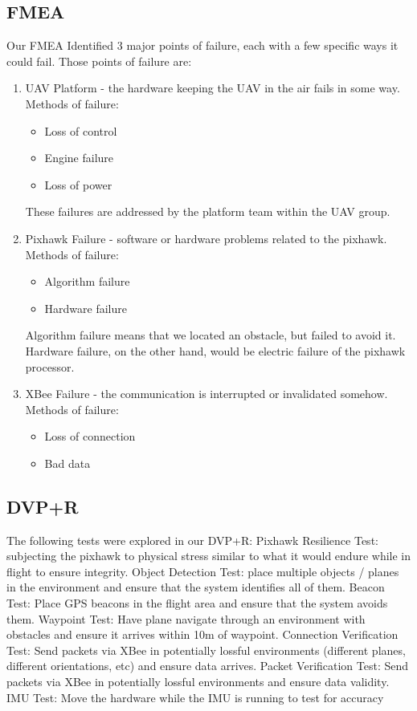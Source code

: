 \documentclass[12pt]{article}
\begin{document}
\subsection{FMEA}
Our FMEA Identified 3 major points of failure, each with a few specific ways it could fail. Those points of failure are:
\begin{enumerate}
\item UAV Platform - the hardware keeping the UAV in the air fails in some way. Methods of failure:
  \begin{itemize}
  \item Loss of control
  \item Engine failure
  \item Loss of power
  \end{itemize}
These failures are addressed by the platform team within the UAV group.
\item Pixhawk Failure - software or hardware problems related to the pixhawk. Methods of failure:
  \begin{itemize}
  \item Algorithm failure
  \item Hardware failure
  \end{itemize}
Algorithm failure means that we located an obstacle, but failed to avoid it. Hardware failure, on the other hand, would be electric failure of the pixhawk processor.
\item XBee Failure - the communication is interrupted or invalidated somehow. Methods of failure:
  \begin{itemize}
  \item Loss of connection
  \item Bad data
  \end{itemize}
\end{enumerate}

\subsection{DVP+R}
The following tests were explored in our DVP+R:
Pixhawk Resilience Test: subjecting the pixhawk to physical stress similar to what it would endure while in flight to ensure integrity.
Object Detection Test: place multiple objects / planes in the environment and ensure that the system identifies all of them.
Beacon Test: Place GPS beacons in the flight area and ensure that the system avoids them.
Waypoint Test: Have plane navigate through an environment with obstacles and ensure it arrives within 10m of waypoint.
Connection Verification Test: Send packets via XBee in potentially lossful environments (different planes, different orientations, etc) and ensure data arrives.
Packet Verification Test: Send packets via XBee in potentially lossful environments and ensure data validity.
IMU Test: Move the hardware while the IMU is running to test for accuracy
\end{document}
